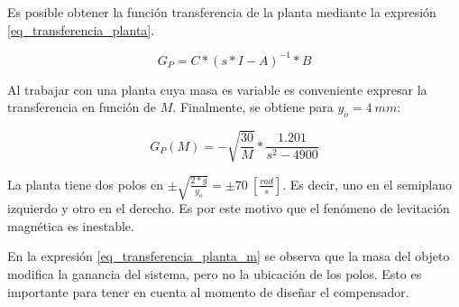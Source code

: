 \noindent Es posible obtener la función transferencia de la planta mediante la expresión \ref{eq_transferencia_planta}.

\begin{equation}\label{eq_transferencia_planta}
	G_{P}=C*(s*I-A)^{-1}*B
\end{equation}

\noindent \noindent Al trabajar con una planta cuya masa es variable es conveniente expresar la transferencia en función de $M$. Finalmente, se obtiene para $y_{o}=4\:mm$:

\begin{equation} \label{eq_transferencia_planta_m}
	G_{P}(M)=-\sqrt{\frac{30}{M}}*\frac{1.201}{s^{2}-4900}
\end{equation}

\noindent La planta tiene dos polos en $\pm\sqrt{\frac{2*g}{y_{o}}}=\pm70\:[\frac{rad}{s}]$. Es decir, uno en el semiplano izquierdo y otro en el derecho. Es por este motivo que el fenómeno de levitación magnética es inestable.

\noindent En la expresión \ref{eq_transferencia_planta_m} se observa que la masa del objeto modifica la ganancia del sistema, pero no la ubicación de los polos. Esto es importante para tener en cuenta al momento de diseñar el compensador.

